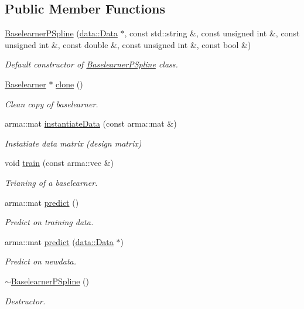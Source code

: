 \subsection*{Public Member Functions}
\begin{DoxyCompactItemize}
\item 
\mbox{\hyperlink{classblearner_1_1_baselearner_p_spline_af891e692907a085213491c584305fbde}{Baselearner\+P\+Spline}} (\mbox{\hyperlink{classdata_1_1_data}{data\+::\+Data}} $\ast$, const std\+::string \&, const unsigned int \&, const unsigned int \&, const double \&, const unsigned int \&, const bool \&)
\begin{DoxyCompactList}\small\item\em Default constructor of {\ttfamily \mbox{\hyperlink{classblearner_1_1_baselearner_p_spline}{Baselearner\+P\+Spline}}} class. \end{DoxyCompactList}\item 
\mbox{\hyperlink{classblearner_1_1_baselearner}{Baselearner}} $\ast$ \mbox{\hyperlink{classblearner_1_1_baselearner_p_spline_aea7d3c0ef6d77ffb8a2fb2000fae6399}{clone}} ()
\begin{DoxyCompactList}\small\item\em Clean copy of baselearner. \end{DoxyCompactList}\item 
arma\+::mat \mbox{\hyperlink{classblearner_1_1_baselearner_p_spline_a1a83493d31e14f7e28d0aba40a3f4396}{instantiate\+Data}} (const arma\+::mat \&)
\begin{DoxyCompactList}\small\item\em Instatiate data matrix (design matrix) \end{DoxyCompactList}\item 
void \mbox{\hyperlink{classblearner_1_1_baselearner_p_spline_a48935f40abc8b393b674c39f4efcff25}{train}} (const arma\+::vec \&)
\begin{DoxyCompactList}\small\item\em Trianing of a baselearner. \end{DoxyCompactList}\item 
arma\+::mat \mbox{\hyperlink{classblearner_1_1_baselearner_p_spline_a7d170166132a69ad0fb046e4599e0336}{predict}} ()
\begin{DoxyCompactList}\small\item\em Predict on training data. \end{DoxyCompactList}\item 
arma\+::mat \mbox{\hyperlink{classblearner_1_1_baselearner_p_spline_a241485cc3e932c45564370a0881e3772}{predict}} (\mbox{\hyperlink{classdata_1_1_data}{data\+::\+Data}} $\ast$)
\begin{DoxyCompactList}\small\item\em Predict on newdata. \end{DoxyCompactList}\item 
\mbox{\hyperlink{classblearner_1_1_baselearner_p_spline_a52c77efff22f6da5fd058eb36da24141}{$\sim$\+Baselearner\+P\+Spline}} ()
\begin{DoxyCompactList}\small\item\em Destructor. \end{DoxyCompactList}\end{DoxyCompactItemize}
